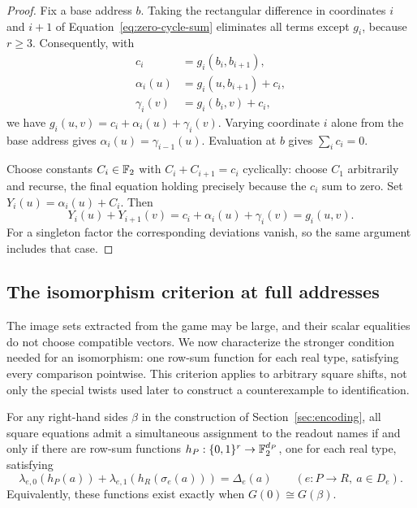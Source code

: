 \begin{proof}
Fix a base address $b$. Taking the rectangular difference in
coordinates $i$ and $i+1$ of Equation~\eqref{eq:zero-cycle-sum}
eliminates all terms except $g_i$, because $r\ge3$. Consequently,
with
\begin{align*}
 c_i&=g_i(b_i,b_{i+1}),\\
 \alpha_i(u)&=g_i(u,b_{i+1})+c_i,\\
 \gamma_i(v)&=g_i(b_i,v)+c_i,
\end{align*}
we have $g_i(u,v)=c_i+\alpha_i(u)+\gamma_i(v)$.
Varying coordinate $i$ alone from the base address gives
$\alpha_i(u)=\gamma_{i-1}(u)$. Evaluation at $b$ gives
$\sum_i c_i=0$.

Choose constants $C_i\in\mathbb F_2$ with $C_i+C_{i+1}=c_i$ cyclically:
choose $C_1$ arbitrarily and recurse, the final equation holding
precisely because the $c_i$ sum to zero. Set
$Y_i(u)=\alpha_i(u)+C_i$. Then
\[
 Y_i(u)+Y_{i+1}(v)
   =c_i+\alpha_i(u)+\gamma_i(v)=g_i(u,v).
\]
For a singleton factor the corresponding deviations vanish, so
the same argument includes that case.
\end{proof}

\subsection{The isomorphism criterion at full addresses}

The image sets extracted from the game may be large, and their scalar
equalities do not choose compatible vectors. We now characterize the
stronger condition needed for an isomorphism: one row-sum function for
each real type, satisfying every comparison pointwise. This criterion
applies to arbitrary square shifts, not only the special twists used
later to construct a counterexample to identification.

\begin{proposition}
\label{prop:global-offsets}
For any right-hand sides $\beta$ in the construction of
Section~\ref{sec:encoding}, all square equations admit a simultaneous
assignment to the readout names if and only if there are row-sum
functions
$h_P:\{0,1\}^r\to\mathbb F_2^{d_P}$, one for each real type, satisfying
\begin{equation}
 \lambda_{e,0}(h_P(a))+\lambda_{e,1}(h_R(\sigma_e(a)))
       =\Delta_e(a)
 \qquad(e:P\to R,\ a\in D_e).
 \label{eq:global-offsets}
\end{equation}
Equivalently, these functions exist exactly when
$G(0)\cong G(\beta)$.
\end{proposition}

